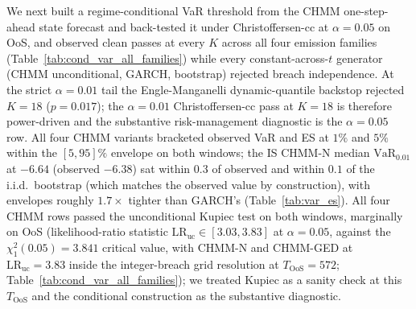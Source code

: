 We next built a regime-conditional VaR threshold from the CHMM one-step-ahead state forecast and back-tested it under Christoffersen-cc at $\alpha = 0.05$ on OoS, and observed clean passes at every $K$ across all four emission families (Table~\ref{tab:cond_var_all_families}) while every constant-across-$t$ generator (CHMM unconditional, GARCH, bootstrap) rejected breach independence. At the strict $\alpha = 0.01$ tail the Engle-Manganelli dynamic-quantile backstop rejected $K = 18$ ($p = 0.017$); the $\alpha = 0.01$ Christoffersen-cc pass at $K = 18$ is therefore power-driven and the substantive risk-management diagnostic is the $\alpha = 0.05$ row. All four CHMM variants bracketed observed VaR and ES at $1\%$ and $5\%$ within the $[5, 95]\%$ envelope on both windows; the IS CHMM-N median $\text{VaR}_{0.01}$ at $-6.64$ (observed $-6.38$) sat within $0.3$ of observed and within $0.1$ of the i.i.d.\ bootstrap (which matches the observed value by construction), with envelopes roughly $1.7\times$ tighter than GARCH's (Table~\ref{tab:var_es}). All four CHMM rows passed the unconditional Kupiec test on both windows, marginally on OoS (likelihood-ratio statistic $\text{LR}_{\text{uc}} \in [3.03, 3.83]$ at $\alpha = 0.05$, against the $\chi^2_1(0.05) = 3.841$ critical value, with CHMM-N and CHMM-GED at $\text{LR}_{\text{uc}} = 3.83$ inside the integer-breach grid resolution at $T_{\text{OoS}} = 572$; Table~\ref{tab:cond_var_all_families}); we treated Kupiec as a sanity check at this $T_{\text{OoS}}$ and the conditional construction as the substantive diagnostic.

